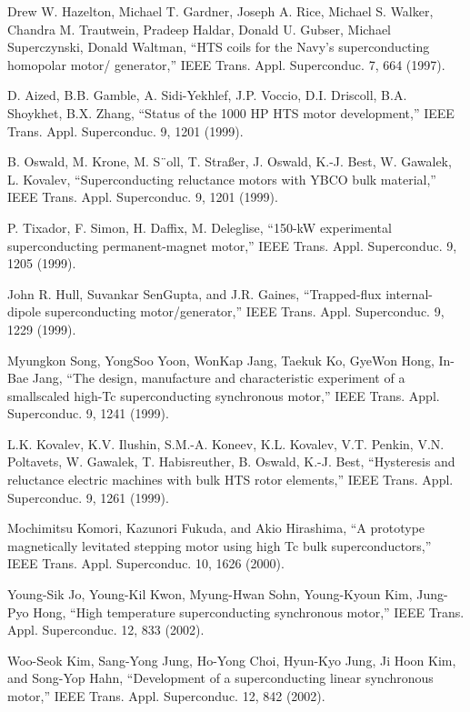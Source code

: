 \noindent [9.211] Drew W. Hazelton, Michael T. Gardner, Joseph A. Rice, Michael S. Walker,
Chandra M. Trautwein, Pradeep Haldar, Donald U. Gubser, Michael Superczynski,
Donald Waltman, ``HTS coils for the Navy’s superconducting homopolar motor/
generator,” IEEE Trans. Appl. Superconduc. 7, 664 (1997).

\noindent [9.212] D. Aized, B.B. Gamble, A. Sidi-Yekhlef, J.P. Voccio, D.I. Driscoll, B.A. Shoykhet,
B.X. Zhang, ``Status of the 1000 HP HTS motor development,” IEEE Trans. Appl.
Superconduc. 9, 1201 (1999).

\noindent [9.213] B. Oswald, M. Krone, M. S¨oll, T. Straßer, J. Oswald, K.-J. Best, W. Gawalek, L.
Kovalev, ``Superconducting reluctance motors with YBCO bulk material,” IEEE
Trans. Appl. Superconduc. 9, 1201 (1999).

\noindent [9.214] P. Tixador, F. Simon, H. Daffix, M. Deleglise, ``150-kW experimental superconducting
permanent-magnet motor,” IEEE Trans. Appl. Superconduc. 9, 1205 (1999).

\noindent [9.215] John R. Hull, Suvankar SenGupta, and J.R. Gaines, ``Trapped-flux internal-dipole
superconducting motor/generator,” IEEE Trans. Appl. Superconduc. 9, 1229
(1999).

\noindent [9.216] Myungkon Song, YongSoo Yoon, WonKap Jang, Taekuk Ko, GyeWon Hong, In-
Bae Jang, ``The design, manufacture and characteristic experiment of a smallscaled
high-Tc superconducting synchronous motor,” IEEE Trans. Appl. Superconduc. 9, 1241 (1999).

\noindent [9.217] L.K. Kovalev, K.V. Ilushin, S.M.-A. Koneev, K.L. Kovalev, V.T. Penkin, V.N.
Poltavets, W. Gawalek, T. Habisreuther, B. Oswald, K.-J. Best, ``Hysteresis and
reluctance electric machines with bulk HTS rotor elements,” IEEE Trans. Appl.
Superconduc. 9, 1261 (1999).

\noindent [9.218] Mochimitsu Komori, Kazunori Fukuda, and Akio Hirashima, ``A prototype magnetically
levitated stepping motor using high Tc bulk superconductors,” IEEE
Trans. Appl. Superconduc. 10, 1626 (2000).

\noindent [9.219] Young-Sik Jo, Young-Kil Kwon, Myung-Hwan Sohn, Young-Kyoun Kim, Jung-
Pyo Hong, ``High temperature superconducting synchronous motor,” IEEE Trans.
Appl. Superconduc. 12, 833 (2002).

\noindent [9.220] Woo-Seok Kim, Sang-Yong Jung, Ho-Yong Choi, Hyun-Kyo Jung, Ji Hoon Kim,
and Song-Yop Hahn, ``Development of a superconducting linear synchronous motor,”
IEEE Trans. Appl. Superconduc. 12, 842 (2002).

